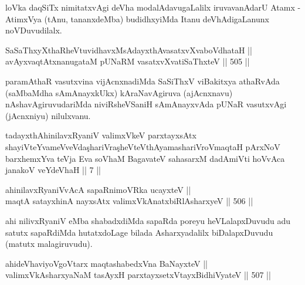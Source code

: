 \begin{artha}
loVka daqSiTx nimitatxvAgi deVha modalAdavugaLalilx iruvavanAdarU
Atamx - AtimxVya (tAnu, tananxdeMba) budidhxyiMda Itanu
deVhAdigaLanunx noVDuvudilalx.
\end{artha}


\begin{shl}
SaSaThxyXthaRheVtuvidhavxMsAdayxthAvasatxvXvaboVdhataH || \\
avAyxvaqtAtxnanugataM pUNaRM vasatxvXvatiSaThxteV \hfill || 505 ||  
\end{shl}

\begin{artha}
paramAthaR vasutxvina vijAcnxnadiMda SaSiThxV viBakitxya athaRvAda
(saMbaMdha sAmAnayxkUkx) kAraNavAgiruva (ajAcnxnavu)
nAshavAgiruvudariMda niviRsheVSaniH sAmAnayxvAda pUNaR vasutxvAgi
(jAcnxniyu) nilulxvanu.
\end{artha}

\begin{shl}
tadayxthA\s hinilavxRyaniV valimxVkeV parxtayxsAtx shayiVteYvameVveVda\c  shariVra\c  sheVteV\s thAyamashariVroV\s maqtaH pArxNoV barxhemxYva teVja Eva soV\s haM BagavateV sahasarxM dadAmiVti hoVvAca janakoV veYdeVhaH || 7 ||
\end{shl}


\begin{shl}
ahinilavxRyaniVvAcA sapaRnimoVRka ucayxteV || \\
maqtA satayxhinA nayxsAtx valimxVkAnatxbiRlAsharxyeV \hfill || 506 ||
\end{shl}

\begin{artha}
ahi nilivxRyaniV eMba shabadxdiMda sapaRda poreyu heVLalapxDuvudu adu
satutx sapaRdiMda hutatxdoLage bilada Asharxyadalilx biDalapxDuvudu
(matutx malagiruvudu).
\end{artha}

\begin{shl}
ahideVhaviyoVgoV\s tarx maqtashabedxVna BaNayxteV || \\
valimxVkAsharxyaNaM tasAyxH parxtayxsetxVtayxBidhiVyateV \hfill || 507 ||  
\end{shl}

